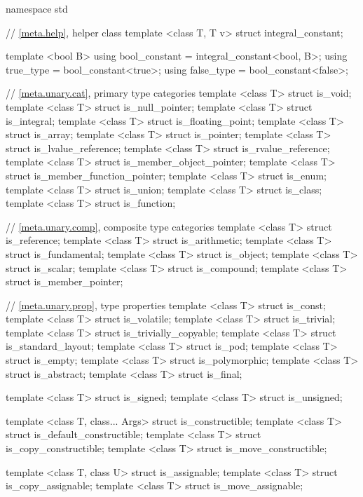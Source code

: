 %
%
\begin{codeblock}
namespace std {
  // \ref{meta.help}, helper class
  template <class T, T v> struct integral_constant;

  template <bool B>
    using bool_constant = integral_constant<bool, B>;
  using true_type  = bool_constant<true>;
  using false_type = bool_constant<false>;

  // \ref{meta.unary.cat}, primary type categories
  template <class T> struct is_void;
  template <class T> struct is_null_pointer;
  template <class T> struct is_integral;
  template <class T> struct is_floating_point;
  template <class T> struct is_array;
  template <class T> struct is_pointer;
  template <class T> struct is_lvalue_reference;
  template <class T> struct is_rvalue_reference;
  template <class T> struct is_member_object_pointer;
  template <class T> struct is_member_function_pointer;
  template <class T> struct is_enum;
  template <class T> struct is_union;
  template <class T> struct is_class;
  template <class T> struct is_function;

  // \ref{meta.unary.comp}, composite type categories
  template <class T> struct is_reference;
  template <class T> struct is_arithmetic;
  template <class T> struct is_fundamental;
  template <class T> struct is_object;
  template <class T> struct is_scalar;
  template <class T> struct is_compound;
  template <class T> struct is_member_pointer;

  // \ref{meta.unary.prop}, type properties
  template <class T> struct is_const;
  template <class T> struct is_volatile;
  template <class T> struct is_trivial;
  template <class T> struct is_trivially_copyable;
  template <class T> struct is_standard_layout;
  template <class T> struct is_pod;
  template <class T> struct is_empty;
  template <class T> struct is_polymorphic;
  template <class T> struct is_abstract;
  template <class T> struct is_final;

  template <class T> struct is_signed;
  template <class T> struct is_unsigned;

  template <class T, class... Args> struct is_constructible;
  template <class T> struct is_default_constructible;
  template <class T> struct is_copy_constructible;
  template <class T> struct is_move_constructible;

  template <class T, class U> struct is_assignable;
  template <class T> struct is_copy_assignable;
  template <class T> struct is_move_assignable;

}
\end{codeblock}
